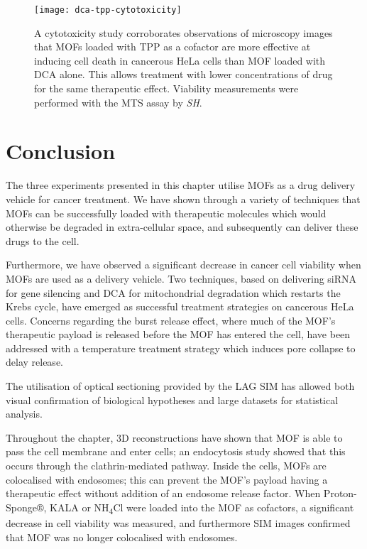 \begin{figure}[htbp!]
\centering
\texttt{[image: dca-tpp-cytotoxicity]}
\caption[MOFs: Loading MOFs with TPP as a cofactor facilitates lower drug concentration] {A cytotoxicity study corroborates observations of microscopy images that MOFs loaded with TPP as a cofactor are more effective at inducing cell death in cancerous HeLa cells than MOF loaded with DCA alone. This allows treatment with lower concentrations of drug for the same therapeutic effect. Viability measurements were performed with the MTS assay by \textit{SH}. }
\label{fig:dca-tpp-cytotoxicity}
\end{figure}


\section{Conclusion} \label{sec:mof-conclusion}
The three experiments presented in this chapter utilise MOFs as a drug delivery vehicle for cancer treatment.
We have shown through a variety of techniques that MOFs can be successfully loaded with therapeutic molecules which would otherwise be degraded in extra-cellular space, and subsequently can deliver these drugs to the cell.

Furthermore, we have observed a significant decrease in cancer cell viability when MOFs are used as a delivery vehicle.
Two techniques, based on delivering siRNA for gene silencing and DCA for mitochondrial degradation which restarts the Krebs cycle, have emerged as successful treatment strategies on cancerous HeLa cells.
Concerns regarding the burst release effect, where much of the MOF's therapeutic payload is released before the MOF has entered the cell, have been addressed with a temperature treatment strategy which induces pore collapse to delay release.

The utilisation of optical sectioning provided by the LAG SIM has allowed both visual confirmation of biological hypotheses and large datasets for statistical analysis.

Throughout the chapter, 3D reconstructions have shown that MOF is able to pass the cell membrane and enter cells; an endocytosis study showed that this occurs through the clathrin-mediated pathway.
Inside the cells, MOFs are colocalised with endosomes; this can prevent the MOF's payload having a therapeutic effect without addition of an endosome release factor.
When Proton-Sponge®, KALA or NH\textsubscript{4}Cl were loaded into the MOF as cofactors, a significant decrease in cell viability was measured, and furthermore SIM images confirmed that MOF was no longer colocalised with endosomes.

